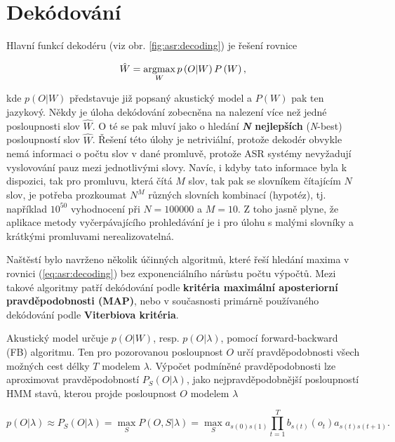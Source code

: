 \section{Dekódování}
\label{chap:asr:decoding}

Hlavní funkcí dekodéru (viz obr. \ref{fig:asr:decoding}) je řešení rovnice

\begin{equation}
  \hat{W} = \operatorname*{argmax}_{W} p\left(O | W\right)P\left(W\right),
  \label{eq:asr:decoding:decoder}
\end{equation}

\noindent kde $p\left(O|W\right)$ představuje již popsaný akustický model a $P\left(W\right)$ pak ten jazykový. Někdy je úloha dekódování zobecněna na nalezení více než jedné posloupnosti slov $\hat{W}$. O té se pak mluví jako o hledání \textbf{\textit{N} nejlepších} (\textit{N}-best) posloupností slov $\hat{W}$.  Řešení této úlohy je netriviální, protože dekodér obvykle nemá informaci o počtu slov v dané promluvě, protože ASR systémy nevyžadují vyslovování pauz mezi jednotlivými slovy. Navíc, i kdyby tato informace byla k dispozici, tak pro promluvu, která čítá $M$ slov, tak pak se slovníkem čítajícím $N$ slov, je potřeba prozkoumat $N^{M}$ různých slovních kombinací (hypotéz), tj. například $10^{50}$ vyhodnocení při $N=100000$ a $M=10$. Z toho jasně plyne, že aplikace metody vyčerpávajícího prohledávání je i pro úlohu s malými slovníky a krátkými promluvami nerealizovatelná.

Naštěstí bylo navrženo několik účinných algoritmů, které řeší hledání maxima v rovnici (\ref{eq:asr:decoding}) bez exponenciálního nárůstu počtu výpočtů. Mezi takové algoritmy patří dekódování podle \textbf{kritéria maximální aposteriorní pravděpodobnosti (MAP)}, nebo v současnosti primárně používaného dekódování podle \textbf{Viterbiova kritéria}.

Akustický model určuje $p\left(O|W\right)$, resp. $p\left(O|\lambda\right)$, pomocí forward-backward (FB) algoritmu. Ten pro pozorovanou posloupnost $O$ určí pravděpodobnosti všech možných cest délky $T$ modelem $\lambda$. Výpočet podmíněné pravděpodobnosti lze aproximovat pravděpodobností $P_S(O|\lambda)$, jako nejpravděpodobnější posloupností HMM stavů, kterou projde posloupnost $O$ modelem $\lambda$

\begin{equation}
  p\left(O|\lambda\right) \approx P_S\left(O|\lambda\right) = \max_S P\left(O, S| \lambda \right) = \max_S a_{s\left(0\right)s\left(1\right)} \prod_{t=1}^{T} b_{s\left(t\right)}\left(o_t\right) a_{s\left(t\right)s\left(t+1\right)}.
  \label{eq:asr:decoding:approx}
\end{equation}

